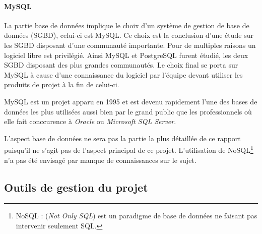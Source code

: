 			\paragraph{MySQL}
La partie base de données implique le choix d'un système de gestion de base de données (SGBD), celui-ci est MySQL. Ce choix est la conclusion d'une étude sur les SGBD disposant d'une communauté importante. Pour de multiples raisons un logiciel libre est privilégié. Ainsi MySQL et PostgreSQL furent étudié, les deux SGBD disposant des plus grandes communautés. Le choix final se porta sur MySQL à cause d'une connaissance du logiciel par l'équipe devant utiliser les produits de projet à la fin de celui-ci.

MySQL est un projet apparu en 1995 et est devenu rapidement l'une des bases de données les plus utilisées aussi bien par le grand public que les professionnels où elle fait conccurence à \emph{Oracle} ou \emph{Microsoft SQL Server}.

L'aspect base de données ne sera pas la partie la plus détaillée de ce rapport puisqu'il ne s'agit pas de l'aspect principal de ce projet. L'utilisation de NoSQL\footnote{NoSQL : (\emph{Not Only SQL}) est un paradigme de base de données ne faisant pas intervenir seulement SQL.} n'a pas été envisagé par manque de connaissances sur le sujet.


	\subsection{Outils de gestion du projet}

%		
%		

